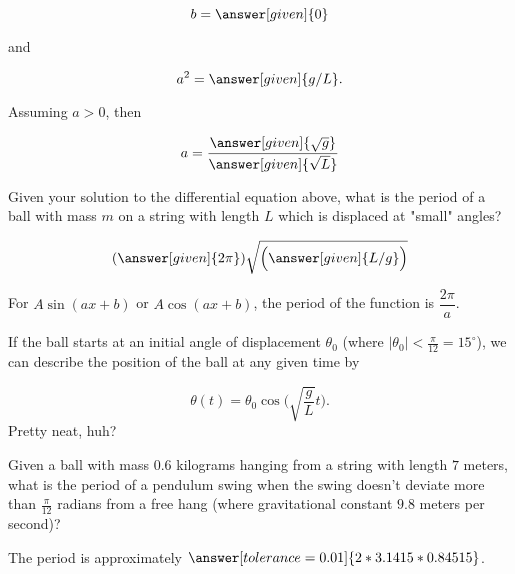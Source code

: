 \documentclass[handout,nooutcomes]{ximera}
\begin{document}
\begin{example}
\begin{explanation}
\begin{question}
\[
b = \answer[given]{0}
\]

and 

\[
a^2 = \answer[given]{g/L}.
\]

Assuming $a>0$, then 

\[
a = \dfrac{\answer[given]{\sqrt{g}}}{\answer[given]{\sqrt{L}}}
\]
\end{question}

\begin{question}
Given your solution to the differential equation above, what is the period of a ball with mass $m$ on a string with length $L$ which is displaced at "small" angles?

\[
(\answer[given]{2\pi})\sqrt{\Big(\answer[given]{L/g}\Big)}
\]
\begin{hint}
For $A\sin(ax+b)$ or $A\cos(ax+b)$, the period of the function is $\dfrac{2\pi}{a}$.
\end{hint}
\end{question}

If the ball starts at an initial angle of displacement $\theta_0$
(where $|\theta_0|<\frac{\pi}{12}= 15^\circ$), we can describe
the position of the ball at any given time by

\[
\theta(t) = \theta_0 \cos\Big(\sqrt{\frac{g}{L}} t\Big).
\]
Pretty neat, huh?

\begin{question}
Given a ball with mass $0.6$ kilograms hanging from a string with length $7$ meters, what is the period of a pendulum swing when the swing doesn't deviate more than $\frac{\pi}{12}$ radians from a free hang (where gravitational constant $9.8$ meters per second)?


The period is approximately $\answer[tolerance=0.01]{2*3.1415*0.84515}$.

\end{question}

\end{explanation}
\end{example}
\end{document}

